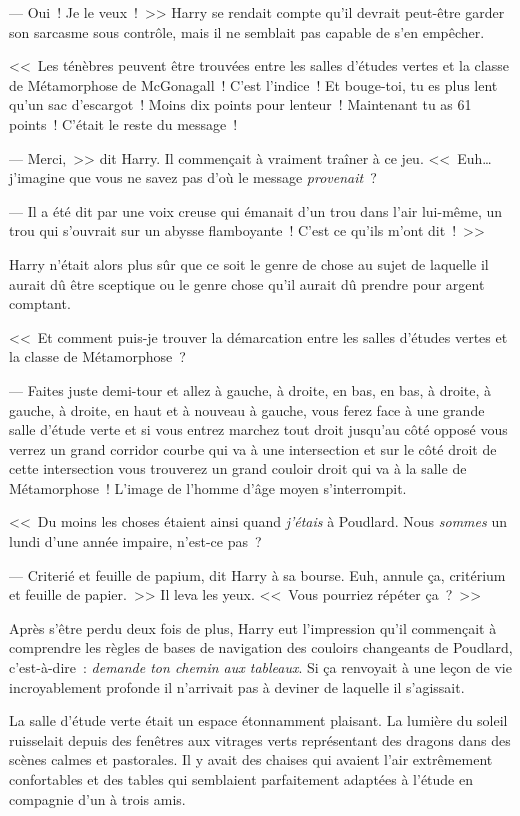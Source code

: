 --- Oui~! Je le veux~!~>> Harry se rendait compte qu'il devrait peut-être garder son sarcasme sous contrôle, mais il ne semblait pas capable de s'en empêcher.

<<~Les ténèbres peuvent être trouvées entre les salles d'études vertes et la classe de Métamorphose de McGonagall~! C'est l'indice~! Et bouge-toi, tu es plus lent qu'un sac d'escargot~! Moins dix points pour lenteur~! Maintenant tu as 61 points~! C'était le reste du message~!

--- Merci,~>> dit Harry. Il commençait à vraiment traîner à ce jeu. <<~Euh… j'imagine que vous ne savez pas d'où le message \emph{provenait}~?

--- Il a été dit par une voix creuse qui émanait d'un trou dans l'air lui-même, un trou qui s'ouvrait sur un abysse flamboyante~! C'est ce qu'ils m'ont dit~!~>>

Harry n'était alors plus sûr que ce soit le genre de chose au sujet de laquelle il aurait dû être sceptique ou le genre chose qu'il aurait dû prendre pour argent comptant.

<<~Et comment puis-je trouver la démarcation entre les salles d'études vertes et la classe de Métamorphose~?

--- Faites juste demi-tour et allez à gauche, à droite, en bas, en bas, à droite, à gauche, à droite, en haut et à nouveau à gauche, vous ferez face à une grande salle d'étude verte et si vous entrez marchez tout droit jusqu'au côté opposé vous verrez un grand corridor courbe qui va à une intersection et sur le côté droit de cette intersection vous trouverez un grand couloir droit qui va à la salle de Métamorphose~! L'image de l'homme d'âge moyen s'interrompit.

<<~Du moins les choses étaient ainsi quand \emph{j'étais} à Poudlard. Nous \emph{sommes} un lundi d'une année impaire, n'est-ce pas~?

--- Criterié et feuille de papium, dit Harry à sa bourse. Euh, annule ça, critérium et feuille de papier.~>> Il leva les yeux. <<~Vous pourriez répéter ça~?~>>

Après s'être perdu deux fois de plus, Harry eut l'impression qu'il commençait à comprendre les règles de bases de navigation des couloirs changeants de Poudlard, c'est-à-dire~: \emph{demande ton chemin aux tableaux}. Si ça renvoyait à une leçon de vie incroyablement profonde il n'arrivait pas à deviner de laquelle il s'agissait.

La salle d'étude verte était un espace étonnamment plaisant. La lumière du soleil ruisselait depuis des fenêtres aux vitrages verts représentant des dragons dans des scènes calmes et pastorales. Il y avait des chaises qui avaient l'air extrêmement confortables et des tables qui semblaient parfaitement adaptées à l'étude en compagnie d'un à trois amis.

